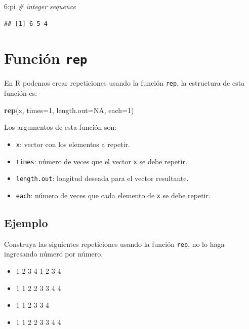 \documentclass[10pt,]{krantz}
\makeatletter
\newenvironment{Shaded}{\begin{snugshade}}{\end{snugshade}}
\newcommand{\KeywordTok}[1]{\textcolor[rgb]{0.13,0.29,0.53}{\textbf{{#1}}}}
\newcommand{\DataTypeTok}[1]{\textcolor[rgb]{0.13,0.29,0.53}{{#1}}}
\newcommand{\DecValTok}[1]{\textcolor[rgb]{0.00,0.00,0.81}{{#1}}}
\newcommand{\CommentTok}[1]{\textcolor[rgb]{0.56,0.35,0.01}{\textit{{#1}}}}
\newcommand{\OtherTok}[1]{\textcolor[rgb]{0.56,0.35,0.01}{{#1}}}
\newcommand{\NormalTok}[1]{{#1}}
\providecommand{\tightlist}{%
  \setlength{\itemsep}{0pt}\setlength{\parskip}{0pt}}
\let\proglang=\textsf
\newenvironment{kframe}{%
\medskip{}
\setlength{\fboxsep}{.8em}
 \def\at@end@of@kframe{}%
 \ifinner\ifhmode%
  \def\at@end@of@kframe{\end{minipage}}%
  \begin{minipage}{\columnwidth}%
 \fi\fi%
 \def\FrameCommand##1{\hskip\@totalleftmargin \hskip-\fboxsep
 \colorbox{shadecolor}{##1}\hskip-\fboxsep
     \hskip-\linewidth \hskip-\@totalleftmargin \hskip\columnwidth}%
 \MakeFramed {\advance\hsize-\width
   \@totalleftmargin\z@ \linewidth\hsize
   \@setminipage}}%
 {\par\unskip\endMakeFramed%
 \at@end@of@kframe}
\renewenvironment{Shaded}{\begin{kframe}}{\end{kframe}}
\makeatother
\begin{document}
\begin{Shaded}
\begin{Highlighting}[]
\DecValTok{6}\NormalTok{:pi  }\CommentTok{# integer sequence}
\end{Highlighting}
\end{Shaded}

\begin{verbatim}
## [1] 6 5 4
\end{verbatim}

\section{\texorpdfstring{Función \texttt{rep} 
}{Función rep  }}\label{funcion-rep}

En \proglang{R} podemos crear repeticiones usando la función
\texttt{rep}, la estructura de esta función es:

\begin{Shaded}
\begin{Highlighting}[]
\KeywordTok{rep}\NormalTok{(x, }\DataTypeTok{times=}\DecValTok{1}\NormalTok{, }\DataTypeTok{length.out=}\OtherTok{NA}\NormalTok{, }\DataTypeTok{each=}\DecValTok{1}\NormalTok{)}
\end{Highlighting}
\end{Shaded}

Los argumentos de esta función son:

\begin{itemize}
\tightlist
\item
  \texttt{x}: vector con los elementos a repetir.
\item
  \texttt{times}: número de veces que el vector \texttt{x} se debe
  repetir.
\item
  \texttt{length.out}: longitud deseada para el vector resultante.
\item
  \texttt{each}: número de veces que cada elemento de \texttt{x} se debe
  repetir.
\end{itemize}

\subsection*{Ejemplo}\label{ejemplo-11}


Construya las siguientes repeticiones usando la función \texttt{rep}, no
lo haga ingresando número por número.

\begin{itemize}
\tightlist
\item
  1 2 3 4 1 2 3 4
\item
  1 1 2 2 3 3 4 4
\item
  1 1 2 3 3 4
\item
  1 1 2 2 3 3 4 4
\end{itemize}
\end{document}
